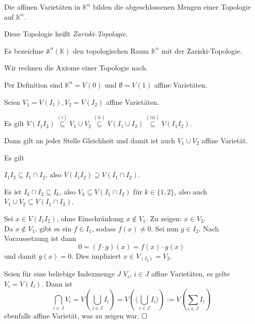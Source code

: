 \documentclass[11pt]{book}
\theoremstyle{nonumberbreak}
\newenvironment{pr}[1][]{\ifthenelse{\equal{#1}{}}{\proof}{\proof[#1]}\rm}{\endproof}
\newenvironment{definbem}[1][]{\ifthenelse{\equal{#1}{}}{\definibem}{\definibem[#1]}\rm}{\enddefinibem}
\begin{document}
\begin{spacing}{1.3}
\begin{definbem} %
\begin{compactenum}
\item Die affinen Varietäten in $\mathbb{K}^n$ bilden die abgeschlossenen Mengen einer Topologie auf $\mathbb{K}^n$.
\item Diese Topologie heißt \textit{Zariski-Topologie}.
\item Es bezeichne $\mathbb{A}^n(\mathbb{K})$ den topologischen Raum $\mathbb{K}^n$ mit der Zariski-Topologie.
\end{compactenum}
\begin{pr}
Wir rechnen die Axiome einer Topologie nach.
\begin{compactenum}
\item[(1)] Per Definition sind $\mathbb{K}^n=V(0)$ und $\emptyset=V(1)$ affine Varietäten.
\item[(2)] Seien $V_1=V(I_1), V_2=V(I_2)$ affine Varietäten.
\begin{compactenum}
\item[\textbf{Beh. (a)}] Es gilt $V(I_1 I_2) \overset{(i)}{\subseteq} V_1 \cup V_2 \overset{(ii)}{\subseteq} V(I_1 \cup I_2) \overset{(iii)}{\subseteq}V(I_1 I_2)$.
\end{compactenum}
Dann gilt an jeder Stelle Gleichheit und damit ist auch $V_1 \cup V_2$ affine Varietät.
\begin{compactenum}
\item[\textbf{Bew. (a)}] Es gilt
\begin{compactenum}
\item[(iii)] $I_1 I_2 \subseteq I_1 \cap I_2$, also $V(I_1 I_2) \supseteq V(I_1 \cap I_2)$.
\item[(ii)] Es ist $I_k \cap I_2 \subseteq I_k$, also $V_k \subseteq V(I_1 \cap I_2)$ für $k \in \{1,2\}$, also auch $V_1 \cup V_2 \subseteq V(I_1 \cap I_2)$.
\item[(i)] Sei $x \in V(I_1 I_2)$, ohne Einschränkung $x \notin V_1$. Zu zeigen: $x \in V_2$.\\
Da $x \notin V_1$, gibt es ein $f \in I_1$, sodass $f(x) \neq 0$. Sei nun $g \in I_2$. Nach Voraussetzung ist dann
$$0=(f\cdot g)(x)=f(x)\cdot g(x)$$
und damit $g(x)=0$. Dies impliziert $x \in V_(I_2)=V_2$.
\end{compactenum}
\end{compactenum}
\item[(3)] Seien für eine beliebige Indexmenge $J$ $V_i$, $i \in J$ affine Varietäten, es gelte $V_i=V(I_i)$. Dann ist
$$\bigcap_{i\in J} V_i = V\left(\bigcup_{i\in J} I_i \right) = V \left( \bigg\langle \bigcup_{i \in J} I_i \bigg\rangle \right) := V\left(\sum_{i\in J} I_i \right)$$
ebenfalls affine Varietät, was zu zeigen war. $\hfill\Box$
\end{compactenum}
\end{pr}
\end{definbem}


\end{spacing}
\end{document}

